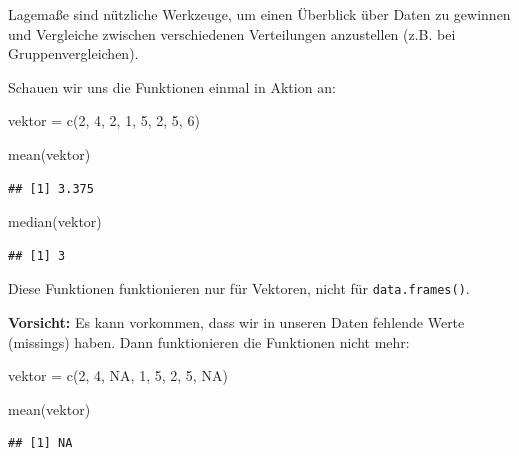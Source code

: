 \documentclass[
]{book}
\newenvironment{Shaded}{\begin{snugshade}}{\end{snugshade}}
\newcommand{\ConstantTok}[1]{\textcolor[rgb]{0.00,0.00,0.00}{#1}}
\newcommand{\DecValTok}[1]{\textcolor[rgb]{0.00,0.00,0.81}{#1}}
\newcommand{\FunctionTok}[1]{\textcolor[rgb]{0.00,0.00,0.00}{#1}}
\newcommand{\NormalTok}[1]{#1}
\newcommand{\OtherTok}[1]{\textcolor[rgb]{0.56,0.35,0.01}{#1}}
\begin{document}
Lagemaße sind nützliche Werkzeuge, um einen Überblick über Daten zu gewinnen und Vergleiche zwischen verschiedenen Verteilungen anzustellen (z.B. bei Gruppenvergleichen).

Schauen wir uns die Funktionen einmal in Aktion an:

\begin{Shaded}
\begin{Highlighting}[]
\NormalTok{vektor }\OtherTok{=} \FunctionTok{c}\NormalTok{(}\DecValTok{2}\NormalTok{, }\DecValTok{4}\NormalTok{, }\DecValTok{2}\NormalTok{, }\DecValTok{1}\NormalTok{, }\DecValTok{5}\NormalTok{, }\DecValTok{2}\NormalTok{, }\DecValTok{5}\NormalTok{, }\DecValTok{6}\NormalTok{)}

\FunctionTok{mean}\NormalTok{(vektor)}
\end{Highlighting}
\end{Shaded}

\begin{verbatim}
## [1] 3.375
\end{verbatim}

\begin{Shaded}
\begin{Highlighting}[]
\FunctionTok{median}\NormalTok{(vektor)}
\end{Highlighting}
\end{Shaded}

\begin{verbatim}
## [1] 3
\end{verbatim}

Diese Funktionen funktionieren nur für Vektoren, nicht für \texttt{data.frames()}.

\textbf{Vorsicht:} Es kann vorkommen, dass wir in unseren Daten fehlende Werte (missings) haben. Dann funktionieren die Funktionen nicht mehr:

\begin{Shaded}
\begin{Highlighting}[]
\NormalTok{vektor }\OtherTok{=} \FunctionTok{c}\NormalTok{(}\DecValTok{2}\NormalTok{, }\DecValTok{4}\NormalTok{, }\ConstantTok{NA}\NormalTok{, }\DecValTok{1}\NormalTok{, }\DecValTok{5}\NormalTok{, }\DecValTok{2}\NormalTok{, }\DecValTok{5}\NormalTok{, }\ConstantTok{NA}\NormalTok{)}

\FunctionTok{mean}\NormalTok{(vektor)}
\end{Highlighting}
\end{Shaded}

\begin{verbatim}
## [1] NA
\end{verbatim}
\end{document}
